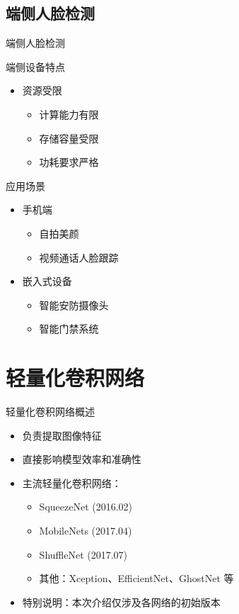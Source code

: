 \documentclass{beamer}
\begin{document}
\subsection{端侧人脸检测}
\begin{frame}{端侧人脸检测}
\begin{block}{端侧设备特点}
\begin{itemize}
    \item 资源受限
    \begin{itemize}
        \item 计算能力有限
        \item 存储容量受限
        \item 功耗要求严格
    \end{itemize}
\end{itemize}
\end{block}

\begin{block}{应用场景}
\begin{itemize}
    \item 手机端
    \begin{itemize}
        \item 自拍美颜
        \item 视频通话人脸跟踪
    \end{itemize}
    \item 嵌入式设备
    \begin{itemize}
        \item 智能安防摄像头
        \item 智能门禁系统
    \end{itemize}
\end{itemize}
\end{block}
\end{frame}
\section{轻量化卷积网络}

\begin{frame}{轻量化卷积网络概述}
    \begin{itemize}
        \item 负责提取图像特征
        \item 直接影响模型效率和准确性
        \item 主流轻量化卷积网络：
        \begin{itemize}
            \item SqueezeNet (2016.02)
            \item MobileNets (2017.04)
            \item ShuffleNet (2017.07)
            \item 其他：Xception、EfficientNet、GhostNet 等
        \end{itemize}
        \item 特别说明：本次介绍仅涉及各网络的初始版本
    \end{itemize}
\end{frame}
\end{document}
